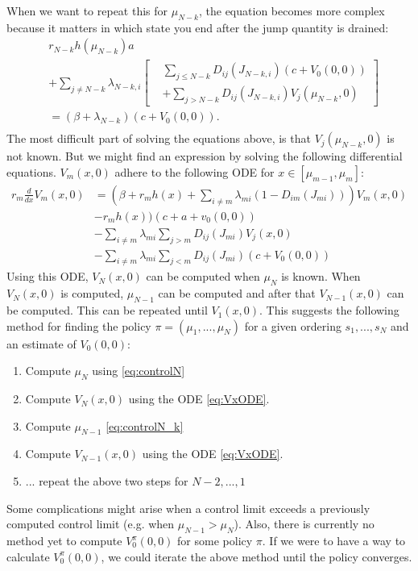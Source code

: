 When we want to repeat this for $\mu_{N-k}$, the equation becomes more complex because it matters in which state you end after the jump quantity is drained:
\begin{equation}\label{eq:controlN_k}
\begin{split}
&r_{N-k} h(\mu_{N-k})a\\
&+\sum\limits_{j\neq {N-k}}\lambda_{N-k,i}\left[
\begin{split}
&\sum\limits_{j\leq N-k}D_{ij}(J_{N-k,i})(c+V_0(0,0))\\
&+\sum\limits_{j>N-k}D_{ij}(J_{N-k,i})V_j(\mu_{N-k},0)
\end{split}\right]\\
&=(\beta+\lambda_{N-k})(c+V_0(0,0)).\\
\end{split}
\end{equation}
The most difficult part of solving the equations above, is that $V_j(\mu_{N-k},0)$ is not known.
But we might find an expression by solving the following differential equations.
$V_{m}(x,0)$ adhere to the following ODE for $x\in[\mu_{m-1},\mu_{m}]$:
\begin{equation}\label{eq:VxODE}
\begin{split}
r_{m}\frac{d}{dx}V_{m}(x,0)&=(\beta+r_mh(x)+\sum\limits_{i\neq m}\lambda_{mi}(1-D_{im}(J_{mi})))V_{m}(x,0)\\
&-r_mh(x))(c+a+v_0(0,0))\\
&-\sum\limits_{i\neq m}\lambda_{mi}\sum\limits_{j>m}D_{ij}(J_{mi})V_j(x,0)\\
&-\sum\limits_{i\neq m}\lambda_{mi}\sum\limits_{j<m}D_{ij}(J_{mi})(c+V_0(0,0))
\end{split}
\end{equation}
Using this ODE, $V_N(x,0)$ can be computed when $\mu_N$ is known. 
When $V_N(x,0)$ is computed, $\mu_{N-1}$ can be computed and after that $V_{N-1}(x,0)$ can be computed.
This can be repeated until $V_1(x,0)$.
This suggests the following method for finding the policy $\pi=(\mu_1,...,\mu_N)$ for a given ordering $s_1,...,s_N$ and an estimate of $V_0(0,0)$:
\begin{enumerate}
\item Compute $\mu_N$ using \eqref{eq:controlN}
\item Compute $V_N(x,0)$ using the ODE \eqref{eq:VxODE}.
\item Compute $\mu_{N-1}$ \eqref{eq:controlN_k}
\item Compute $V_{N-1}(x,0)$ using the ODE \eqref{eq:VxODE}.
\item ... repeat the above two steps for $N-2,...,1$
\end{enumerate}
Some complications might arise when a control limit exceeds a previously computed control limit (e.g. when $\mu_{N-1}>\mu_N$).
Also, there is currently no method yet to compute $V_0^\pi(0,0)$ for some policy $\pi$.
If we were to have a way to calculate $V_0^\pi(0,0)$, we could iterate the above method until the policy converges.

